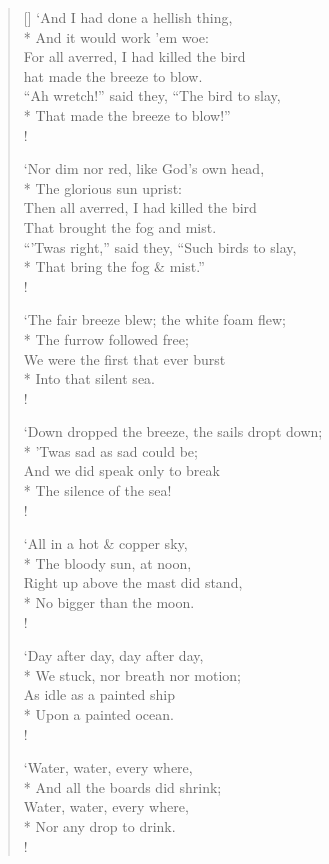 \documentclass[MAIN]{subfiles}
\begin{document}
\begin{verse}[\versewidth]
`And I had done a hellish thing,\\*
\vin And it would work 'em woe:\\
For all averred, I had killed the bird\\
\vin hat made the breeze to blow.\\
``Ah wretch!'' said they, ``The bird to slay,\\*
\vin That made the breeze to blow!''\\!

`Nor dim nor red, like God's own head,\\*
\vin The glorious sun uprist:\\
Then all averred, I had killed the bird\\
\vin That brought the fog and mist.\\
``'Twas right,'' said they, ``Such birds to slay,\\*
\vin That bring the fog \& mist.''\\!

`The fair breeze blew; the white foam flew;\\*
\vin The furrow followed free;\\
We were the first that ever burst\\*
\vin Into that silent sea.\\!

`Down dropped the breeze, the sails dropt down;\\*
\vin 'Twas sad as sad could be;\\
And we did speak only to break\\*
\vin The silence of the sea!\\!

`All in a hot \& copper sky,\\*
\vin The bloody sun, at noon,\\
Right up above the mast did stand,\\*
\vin No bigger than the moon.\\!

`Day after day, day after day,\\*
\vin We stuck, nor breath nor motion;\\
As idle as a painted ship\\*
\vin Upon a painted ocean.\\!

`Water, water, every where,\\*
\vin And all the boards did shrink;\\
Water, water, every where,\\*
\vin Nor any drop to drink.\\!


\end{verse}
\end{document}
